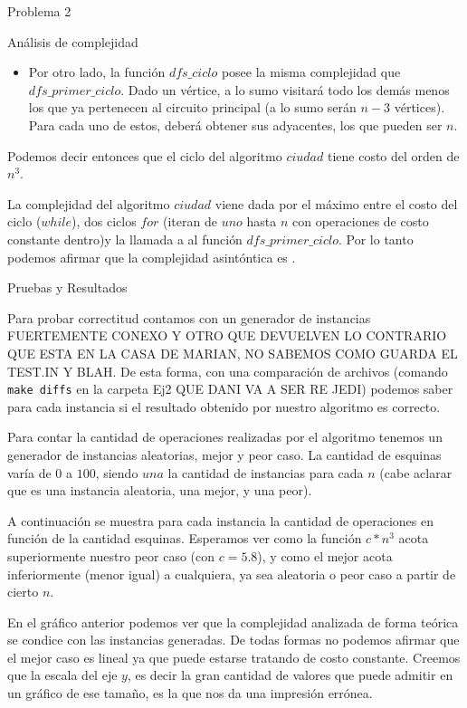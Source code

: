 \begin{section}{Problema 2}
\begin{subsection}{Análisis de complejidad}
\begin{itemize}
\begin{itemize}
			\item Por otro lado, la función $dfs\_ciclo$ posee la misma complejidad que $dfs\_primer\_ciclo$. Dado un vértice, a lo sumo visitará todo los demás menos los que ya pertenecen al circuito principal (a lo sumo serán $n-3$ vértices). Para cada uno de estos, deberá obtener sus adyacentes, los que pueden ser $n$.
			\end{itemize}
		\end{itemize}

		Podemos decir entonces que el ciclo del algoritmo $ciudad$ tiene costo del orden de $n^3$.

		La complejidad del algoritmo $ciudad$ viene dada por el máximo entre el costo del ciclo ($while$), dos ciclos $for$ (iteran de $uno$ hasta $n$ con operaciones de costo constante dentro)y la llamada a al función $dfs\_primer\_ciclo$. Por lo tanto podemos afirmar que la complejidad asintóntica es .
	\end{subsection}

	\begin{subsection}{Pruebas y Resultados}
	
		Para probar correctitud contamos con un generador de instancias FUERTEMENTE CONEXO Y OTRO QUE DEVUELVEN LO CONTRARIO QUE ESTA EN LA CASA DE MARIAN, NO SABEMOS COMO GUARDA EL TEST.IN Y BLAH. De esta forma, con una comparación de archivos (comando \texttt{make diffs} en la carpeta Ej2 QUE DANI VA A SER RE JEDI) podemos saber para cada instancia si el resultado obtenido por nuestro algoritmo es correcto.

		Para contar la cantidad de operaciones realizadas por el algoritmo tenemos un generador de instancias aleatorias, mejor y peor caso. La cantidad de esquinas varía de $0$ a $100$, siendo $una$ la cantidad de instancias para cada $n$ (cabe aclarar que es una instancia aleatoria, una mejor, y una peor).

		A continuación se muestra para cada instancia la cantidad de operaciones en función de la cantidad esquinas. Esperamos ver como la función $c*n^3$ acota superiormente nuestro peor caso (con $c=5.8$), y como el mejor acota inferiormente (menor igual) a cualquiera, ya sea aleatoria o peor caso a partir de cierto $n$.


		En el gráfico anterior podemos ver que la complejidad analizada de forma teórica se condice con las instancias generadas. De todas formas no podemos afirmar que el mejor caso es lineal ya que puede estarse tratando de costo constante. Creemos que la escala del eje $y$, es decir la gran cantidad de valores que puede admitir en un gráfico de ese tamaño, es la que nos da una impresión errónea.


\end{subsection}
\end{section}
